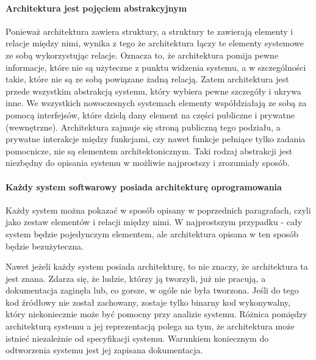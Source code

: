 \paragraph{Architektura jest pojęciem abstrakcyjnym}
Ponieważ architektura zawiera struktury, a struktury te zawierają elementy i relacje między nimi, wynika z tego że architektura łączy te elementy systemowe ze sobą wykorzystując relacje. Oznacza to, że architektura pomija pewne informacje, które nie są użyteczne z punktu widzenia systemu, a w szczególności takie, które nie są ze sobą powiązane żadną relacją. Zatem architektura jest przede wszystkim abstrakcją systemu, który wybiera pewne szczegóły i ukrywa inne. We wszystkich nowoczesnych systemach elementy współdziałają ze sobą za pomocą interfejsów, które dzielą dany element na części publiczne i prywatne (wewnętrzne). Architektura zajmuje się stroną publiczną tego podziału, a prywatne interakcje między funkcjami, czy nawet funkcje pełniące tylko zadania pomocnicze, nie są elementem architektonicznym. Taki rodzaj abstrakcji jest niezbędny do opisania systemu w możliwie najprostszy i zrozumiały sposób.

\paragraph{Każdy system softwarowy posiada architekturę oprogramowania}
Każdy system można pokazać w sposób opisany w poprzednich paragrafach, czyli jako zestaw elementów i relacji między nimi. W najprostszym przypadku - cały system będzie pojedynczym elementem, ale architektura opisana w ten sposób będzie bezużyteczna.

Nawet jeżeli każdy system posiada architekturę, to nie znaczy, że architektura ta jest znana. Zdarza się, że ludzie, którzy ją tworzyli, już nie pracują, a dokumentacja zaginęła lub, co gorsze, w ogóle nie była tworzona. Jeśli do tego kod źródłowy nie został zachowany, zostaje tylko binarny kod wykonywalny, który niekoniecznie może być pomocny przy analizie systemu.
Różnica pomiędzy architekturą systemu a jej reprezentacją polega na tym, że architektura może istnieć niezależnie od specyfikacji systemu.  Warunkiem koniecznym do odtworzenia systemu jest jej zapisana dokumentacja.

